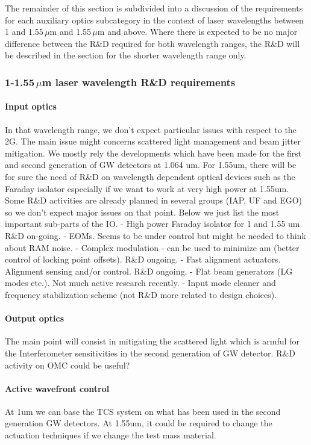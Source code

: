 The remainder of this section is subdivided into a discussion of the requirements for each auxiliary optics subcategory in the context of laser wavelengths between 1 and 1.55\,$\mu$m and 1.55\,$\mu$m and above. Where there is expected to be no major difference between the R\&D required for both wavelength ranges, the R\&D will be described in the section for the shorter wavelength range only. 
\subsubsection{1-1.55\,$\mu$m laser wavelength R\&D requirements}
\paragraph{Input optics}
In that wavelength range, we don’t expect particular issues with respect to the 2G. The main issue might concerns scattered light management and beam jitter mitigation.
We mostly rely the developments which have been made for the first and second generation of GW detectors at 1.064 um. For 1.55um, there will be for sure the need of R\&D on wavelength dependent optical devices such as the Faraday isolator especially if we want to work at very high power at 1.55um. Some R\&D activities are already planned in several groups (IAP, UF and EGO) so we don’t expect major issues on that point.
Below we just list the most important sub-parts of the IO.
-	High power Faraday isolator for 1 and 1.55 um R\&D on-going.
-	EOMs. Seems to be under control but might be needed to think about RAM noise.
-	Complex modulation - can be used to minimize am (better control of locking point offsets). R\&D ongoing.
-	Fast alignment actuators. Alignment sensing and/or control. R\&D ongoing.
-	Flat beam generators (LG modes etc.). Not much active research recently.
-	Input mode cleaner and frequency stabilization scheme (not R\&D more related to design choices). 

\paragraph{Output optics}
The main point will consist in mitigating the scattered light which is armful for the Interferometer sensitivities in the second generation of GW detector.
R\&D activity on OMC could be useful?

\paragraph{Active wavefront control}
At 1um we can base the TCS system on what has been used in the second generation GW detectors.
At 1.55um, it could be required to change the actuation techniques if we change the test mass material.

